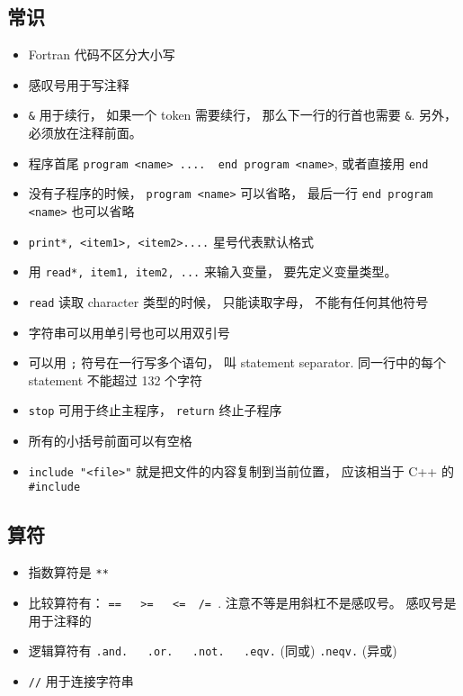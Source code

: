 
\subsection{常识}
\begin{itemize}
\item Fortran 代码不区分大小写
\item 感叹号用于写注释
\item \verb`&` 用于续行， 如果一个 token 需要续行， 那么下一行的行首也需要 \verb`&`. 另外， 必须放在注释前面。
\item 程序首尾  \verb`program <name> ....  end program <name>`, 或者直接用 \verb`end`
\item 没有子程序的时候， \verb`program <name>` 可以省略， 最后一行 \verb`end program <name>` 也可以省略
\item \verb`print*, <item1>, <item2>....` 星号代表默认格式
\item 用 \verb`read*, item1, item2, ...` 来输入变量， 要先定义变量类型。 
\item \verb`read` 读取 character 类型的时候， 只能读取字母， 不能有任何其他符号
\item 字符串可以用单引号也可以用双引号
\item 可以用 \verb`;` 符号在一行写多个语句， 叫 statement separator. 同一行中的每个 statement 不能超过 132 个字符
\item \verb`stop` 可用于终止主程序， \verb`return` 终止子程序
\item 所有的小括号前面可以有空格
\item \verb`include "<file>"` 就是把文件的内容复制到当前位置， 应该相当于 C++ 的 \verb`#include`
\end{itemize}

\subsection{算符}
\begin{itemize}
\item 指数算符是 \verb`**`
\item 比较算符有： \verb`==   >=   <=  /= `.  注意不等是用斜杠不是感叹号。 感叹号是用于注释的
\item 逻辑算符有 \verb`.and.   .or.   .not.   .eqv.` (同或)  \verb`.neqv.` (异或)
\item \verb`//` 用于连接字符串
\end{itemize}

